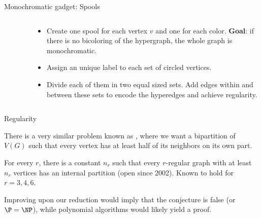 \begin{frame}{Monochromatic gadget: Spools}
\begin{columns}[T]
\begin{column}{0.44\textwidth}
\begin{figure}[!htb]
        \end{figure}
        \end{column}
        \hfill
        \begin{column}{0.5\textwidth}
            \begin{itemize}
                \item Create one spool for each vertex $v$ and one for each color. \textbf{Goal}: if there is no bicoloring of the hypergraph,
                      the whole graph is monochromatic.
                \item Assign an unique label to each set of circled vertices.
                \item Divide each of them in two equal sized sets. Add edges within and between these sets to encode the hyperedges and achieve regularity.
            \end{itemize}
        \end{column}
    \end{columns}
\end{frame}

\begin{frame}{Regularity}
    \begin{block}{}
        There is a very similar problem known as , where we want a bipartition of $V(G)$ such that every vertex has at least half of its neighbors on its own part.
    \end{block}
    \pause
    \begin{conjecture}
        For every $r$, there is a constant $n_r$ such that every $r$-regular graph with at least $n_r$ vertices has an internal partition (open since 2002). Known to hold for $r=3,4,6$.
    \end{conjecture}
    \pause
    \begin{block}{}
        Improving upon our reduction would imply that the conjecture is false (or $\P = \NP$), while polynomial algorithms would likely yield a proof.
    \end{block}{}
\end{frame}


